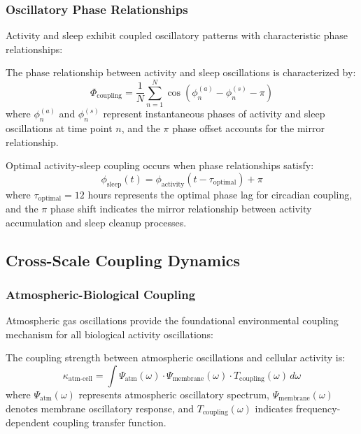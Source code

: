 \subsubsection{Oscillatory Phase Relationships}

Activity and sleep exhibit coupled oscillatory patterns with characteristic phase relationships:

\begin{definition}
The phase relationship between activity and sleep oscillations is characterized by:
\begin{equation}
\Phi_{\text{coupling}} = \frac{1}{N} \sum_{n=1}^{N} \cos(\phi_n^{(a)} - \phi_n^{(s)} - \pi)
\label{eq:phase_coupling}
\end{equation}
where $\phi_n^{(a)}$ and $\phi_n^{(s)}$ represent instantaneous phases of activity and sleep oscillations at time point $n$, and the $\pi$ phase offset accounts for the mirror relationship.
\end{definition}

\begin{definition}
Optimal activity-sleep coupling occurs when phase relationships satisfy:
\begin{equation}
\phi_{\text{sleep}}(t) = \phi_{\text{activity}}(t - \tau_{\text{optimal}}) + \pi
\end{equation}
where $\tau_{\text{optimal}} = 12$ hours represents the optimal phase lag for circadian coupling, and the $\pi$ phase shift indicates the mirror relationship between activity accumulation and sleep cleanup processes.
\end{definition}

\subsection{Cross-Scale Coupling Dynamics}

\subsubsection{Atmospheric-Biological Coupling}

Atmospheric gas oscillations provide the foundational environmental coupling mechanism for all biological activity oscillations:

\begin{definition}
The coupling strength between atmospheric oscillations and cellular activity is:
\begin{equation}
\kappa_{\text{atm-cell}} = \int \Psi_{\text{atm}}(\omega) \cdot \Psi_{\text{membrane}}(\omega) \cdot T_{\text{coupling}}(\omega) \, d\omega
\end{equation}
where $\Psi_{\text{atm}}(\omega)$ represents atmospheric oscillatory spectrum, $\Psi_{\text{membrane}}(\omega)$ denotes membrane oscillatory response, and $T_{\text{coupling}}(\omega)$ indicates frequency-dependent coupling transfer function.
\end{definition}

